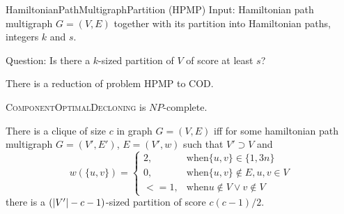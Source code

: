 \begin{problem}{HamiltonianPathMultigraphPartition (HPMP)}
	Input: Hamiltonian path multigraph $G=(V,E)$
		together with its partition into Hamiltonian paths, integers $k$ and $s$.

	Question: Is there a $k$-sized partition of $V$ of score at least $s$?
\end{problem}

\begin{rmrk}
There is a reduction of problem \textsc{HPMP} to \textsc{COD}.
\end{rmrk}

\begin{thm}
\textsc{ComponentOptimalDecloning} is $NP$-complete.
\end{thm}

\begin{lmm}
There is a clique of size $c$ in graph $G=(V,E)$ iff
for some hamiltonian path multigraph $G=(V',E')$, $E=(V',w)$ such that $V' \supset V$ and
$$ w(\{u,v\}) =
\begin{cases}
2, &\text{when} \{u,v\} \in \{1,3n\} \\
0, &\text{when} \{u,v\} \not\in E, u,v \in V \\
<= 1, &\text{when} u \not\in V \vee v \not\in V
\end{cases}
$$
there is a $\left(\left\vert V' \right\vert-c-1\right)$-sized partition of score $c(c-1)/{2}$.
\end{lmm}

